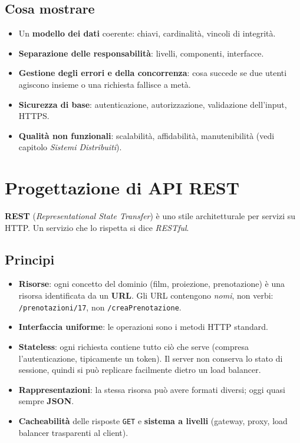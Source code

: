 \subsection{Cosa mostrare}
\begin{itemize}
    \item Un \textbf{modello dei dati} coerente: chiavi, cardinalità, vincoli di integrità.
    \item \textbf{Separazione delle responsabilità}: livelli, componenti, interfacce.
    \item \textbf{Gestione degli errori e della concorrenza}: cosa succede se due utenti agiscono insieme o una richiesta fallisce a metà.
    \item \textbf{Sicurezza di base}: autenticazione, autorizzazione, validazione dell'input, HTTPS.
    \item \textbf{Qualità non funzionali}: scalabilità, affidabilità, manutenibilità (vedi capitolo \emph{Sistemi Distribuiti}).
\end{itemize}

\section{Progettazione di API REST}
\textbf{REST} (\emph{Representational State Transfer}) è uno stile architetturale per servizi su HTTP. Un servizio che lo rispetta si dice \emph{RESTful}.

\subsection{Principi}
\begin{itemize}
    \item \textbf{Risorse}: ogni concetto del dominio (film, proiezione, prenotazione) è una risorsa identificata da un \textbf{URL}. Gli URL contengono \emph{nomi}, non verbi: \texttt{/prenotazioni/17}, non \texttt{/creaPrenotazione}.
    \item \textbf{Interfaccia uniforme}: le operazioni sono i metodi HTTP standard.
    \item \textbf{Stateless}: ogni richiesta contiene tutto ciò che serve (compresa l'autenticazione, tipicamente un token). Il server non conserva lo stato di sessione, quindi si può replicare facilmente dietro un load balancer.
    \item \textbf{Rappresentazioni}: la stessa risorsa può avere formati diversi; oggi quasi sempre \textbf{JSON}.
    \item \textbf{Cacheabilità} delle risposte \texttt{GET} e \textbf{sistema a livelli} (gateway, proxy, load balancer trasparenti al client).
\end{itemize}

